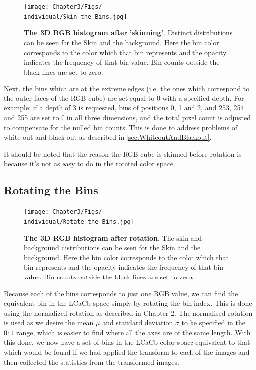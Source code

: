 \begin{figure}[h!] %
  \centering
    \texttt{[image: Chapter3/Figs/\\individual/Skin\_the\_Bins.jpg]}
        \caption{\textbf{The 3D RGB histogram after 'skinning'}. Distinct distributions can be seen for the Skin and the background. Here the bin color corresponds to the color which that bin represents and the opacity indicates the frequency of that bin value. Bin counts outside the black lines are set to zero. }  \label{fig:Skin_the_Bins}
    \end{figure}

Next, the bins which are at the extreme edges (i.e. the ones which correspond to the outer faces of the RGB cube) are set equal to 0 with a specified depth. For example: if a depth of 3 is requested, bins of positions 0, 1 and 2, and 253, 254 and 255 are set to 0 in all three dimensions, and the total pixel count is adjusted to compensate for the nulled bin counts. This is done to address problems of white-out and black-out as described in \ref{sec:WhiteoutAndBlackout}.



It should be noted that the reason the RGB cube is skinned before rotation is because it's not as easy to do in the rotated color space.


\subsection{Rotating the Bins}\label{sec:RotatingTheBins}

\begin{figure}[h!] %
  \centering
    \texttt{[image: Chapter3/Figs/\\individual/Rotate\_the\_Bins.jpg]}
        \caption{\textbf{The 3D RGB histogram after rotation}. The skin and background distributions can be seen for the Skin and the background. Here the bin color corresponds to the color which that bin represents and the opacity indicates the frequency of that bin value. Bin counts outside the black lines are set to zero. }   \label{fig:Rotate_the_Bins}
\end{figure}

Because each of the bins corresponds to just one RGB value, we can find the equivalent bin in the LCaCb space simply by rotating the bin index. This is done using the normalized rotation as described in Chapter 2. The normalised rotation is used as we desire the mean $\mu$ and standard deviation $\sigma$ to be specified in the $0:1$ range, which is easier to find where all the axes are of the same length. With this done, we now have a set of bins in the LCaCb color space equivalent to that which would be found if we had applied the transform to each of the images and then collected the statistics from the transformed images.





